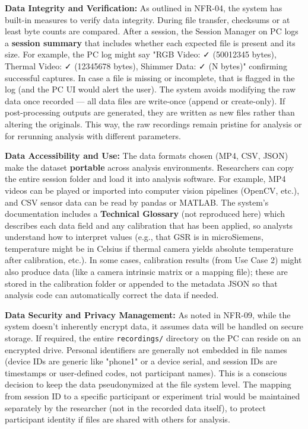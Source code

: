 \textbf{Data Integrity and Verification:} As outlined in NFR-04, the system
has built-in measures to verify data integrity. During file transfer,
checksums or at least byte counts are
compared\cite{DeviceServer}.
After a session, the Session Manager on PC logs a \textbf{session summary}
that includes whether each expected file is present and its
size\cite{SessionManagerKt}.
For example, the PC log might say "RGB Video: ✓ (50012345 bytes),
Thermal Video: ✓ (12345678 bytes), Shimmer Data: ✓ (N bytes)" confirming
successful captures. In case a file is missing or incomplete, that is
flagged in the log (and the PC UI would alert the user). The system
avoids modifying the raw data once recorded --- all data files are
write-once (append or create-only). If post-processing outputs are
generated, they are written as new files rather than altering the
originals. This way, the raw recordings remain pristine for analysis or
for rerunning analysis with different parameters.

\textbf{Data Accessibility and Use:} The data formats chosen (MP4, CSV, JSON)
make the dataset \textbf{portable} across analysis environments. Researchers
can copy the entire session folder and load it into analysis software.
For example, MP4 videos can be played or imported into computer vision
pipelines (OpenCV, etc.), and CSV sensor data can be read by pandas or
MATLAB. The system's documentation includes a \textbf{Technical Glossary}
(not reproduced here) which describes each data field and any
calibration that has been applied, so analysts understand how to
interpret values (e.g., that GSR is in microSiemens, temperature might
be in Celsius if thermal camera yields absolute temperature after
calibration, etc.). In some cases, calibration results (from Use Case 2)
might also produce data (like a camera intrinsic matrix or a mapping
file); these are stored in the calibration folder or appended to the
metadata JSON so that analysis code can automatically correct the data
if needed.

\textbf{Data Security and Privacy Management:} As noted in NFR-09, while the
system doesn't inherently encrypt data, it assumes data will be handled
on secure storage. If required, the entire \texttt{recordings/} directory on
the PC can reside on an encrypted drive. Personal identifiers are
generally not embedded in file names (device IDs are generic like
"phone1" or a device serial, and session IDs are timestamps or
user-defined codes, not participant names). This is a conscious decision
to keep the data pseudonymized at the file system level. The mapping
from session ID to a specific participant or experiment trial would be
maintained separately by the researcher (not in the recorded data
itself), to protect participant identity if files are shared with others
for analysis.

